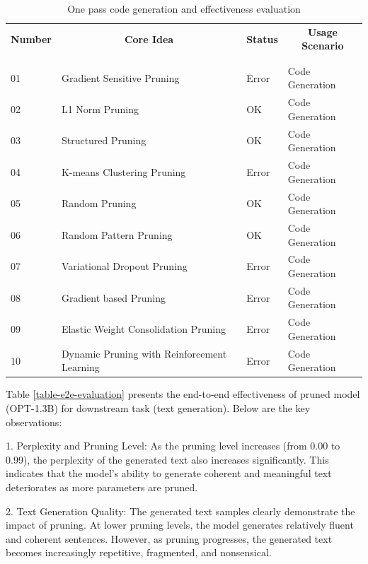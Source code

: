 \documentclass{article} %
\begin{document}
\begin{table}[t]
\caption{One pass code generation and effectiveness evaluation}
\label{table-onepass}
\begin{center}
\begin{tabular}{llll}
\multicolumn{1}{c}{\bf Number}  &\multicolumn{1}{c}{\bf Core Idea} & \multicolumn{1}{c}{\bf Status} & \multicolumn{1}{c}{\bf Usage Scenario} \\
\\ \hline \\
01         &Gradient Sensitive Pruning & Error & Code Generation \\
02         &L1 Norm Pruning & OK & Code Generation \\
03         &Structured Pruning & OK & Code Generation \\
04         &K-means Clustering Pruning & Error & Code Generation \\
05         &Random Pruning & OK & Code Generation \\
06         &Random Pattern Pruning & OK & Code Generation \\
07         &Variational Dropout Pruning & Error & Code Generation \\
08         &Gradient based Pruning & Error & Code Generation \\
09         &Elastic Weight Consolidation Pruning & Error & Code Generation \\
10         &Dynamic Pruning with Reinforcement Learning & Error & Code Generation \\
\end{tabular}
\end{center}
\end{table}

Table \ref{table-e2e-evaluation} presents the end-to-end effectiveness of pruned model (OPT-1.3B) for downstream task (text generation). Below are the key observations:

1. Perplexity and Pruning Level: As the pruning level increases (from 0.00 to 0.99), the perplexity of the generated text also increases significantly. This indicates that the model's ability to generate coherent and meaningful text deteriorates as more parameters are pruned.

2. Text Generation Quality: The generated text samples clearly demonstrate the impact of pruning. At lower pruning levels, the model generates relatively fluent and coherent sentences. However, as pruning progresses, the generated text becomes increasingly repetitive, fragmented, and nonsensical.
\end{document}
